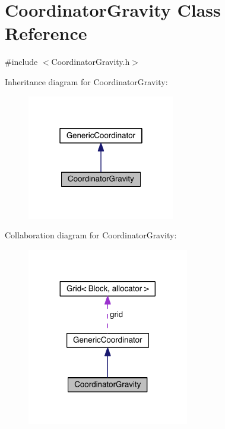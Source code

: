 \hypertarget{class_coordinator_gravity}{}\section{Coordinator\+Gravity Class Reference}
\label{class_coordinator_gravity}


{\ttfamily \#include $<$Coordinator\+Gravity.\+h$>$}



Inheritance diagram for Coordinator\+Gravity\+:\nopagebreak
\begin{figure}[H]
\begin{center}
\leavevmode
\includegraphics[width=183pt]{dc/dde/class_coordinator_gravity__inherit__graph}
\end{center}
\end{figure}


Collaboration diagram for Coordinator\+Gravity\+:\nopagebreak
\begin{figure}[H]
\begin{center}
\leavevmode
\includegraphics[width=200pt]{d4/d0d/class_coordinator_gravity__coll__graph}
\end{center}
\end{figure}

